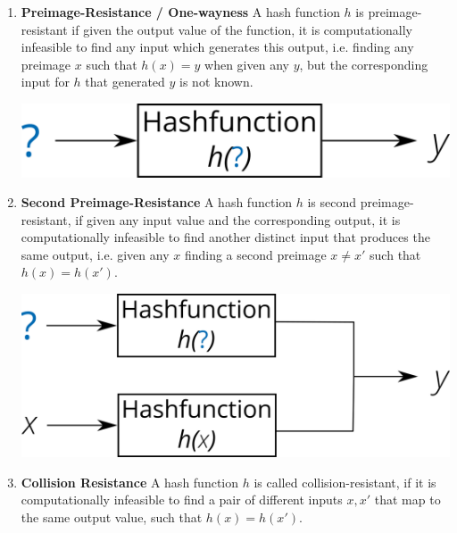 \begin{enumerate} %
	\item \textbf{Preimage-Resistance / One-wayness}
	 A hash function $h$ is preimage-resistant if given the output value of the function, it is computationally infeasible to find any input which generates this output, i.e. finding any preimage $x$ such that $h(x) = y $ when given any $y$, but the corresponding input for $h$ that generated $y$ is not known.

\begin{minipage}[t]{.5\linewidth}
          	\raggedright
            \includegraphics[width=.8\linewidth]{images/Background/preimage_res_horizontal.png}
	      \end{minipage} 

	\item \textbf{Second Preimage-Resistance}
	A hash function $h$ is second preimage-resistant, if given any input value and the corresponding output, it is computationally infeasible to find another distinct
input that produces the same output, i.e. given any $x$ finding a second preimage $x \neq x'$ such that $h(x) = h(x')$. %

\begin{minipage}[t]{.6\linewidth}
          	\raggedright
            \includegraphics[width=.8\linewidth]{images/Background/second_preimage_res_horizontal.png}
	      \end{minipage} 
	
	\item \textbf{Collision Resistance}
	A hash function $h$ is called collision-resistant, if it is computationally infeasible to find a pair of different inputs $x, x'$ that map to the same output value, such that $h(x) = h(x')$.



\end{enumerate}
